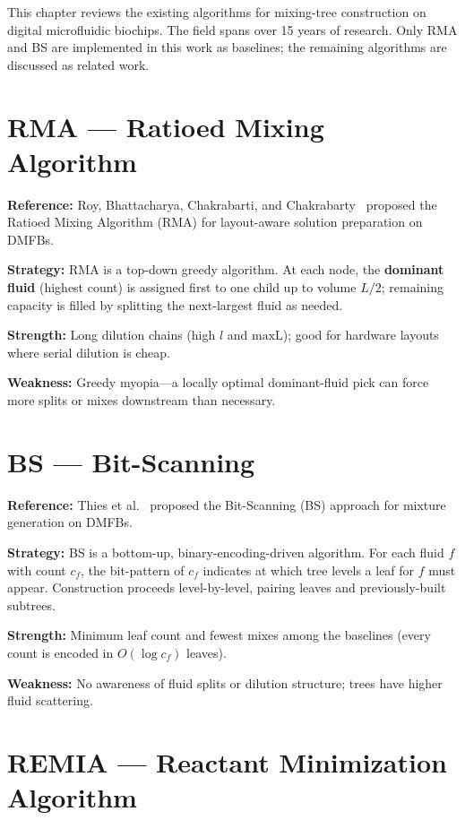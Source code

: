 
This chapter reviews the existing algorithms for mixing-tree construction on digital microfluidic biochips. The field spans over 15 years of research. Only RMA and BS are implemented in this work as baselines; the remaining algorithms are discussed as related work.

\section{RMA --- Ratioed Mixing Algorithm}
\label{sec:rma}

\textbf{Reference:} Roy, Bhattacharya, Chakrabarti, and Chakrabarty~\cite{roy2010layout} proposed the Ratioed Mixing Algorithm (RMA) for layout-aware solution preparation on DMFBs.

\textbf{Strategy:} RMA is a top-down greedy algorithm. At each node, the \textbf{dominant fluid} (highest count) is assigned first to one child up to volume $L/2$; remaining capacity is filled by splitting the next-largest fluid as needed.

\textbf{Strength:} Long dilution chains (high $l$ and $\text{maxL}$); good for hardware layouts where serial dilution is cheap.

\textbf{Weakness:} Greedy myopia---a locally optimal dominant-fluid pick can force more splits or mixes downstream than necessary.

\section{BS --- Bit-Scanning}
\label{sec:bs}

\textbf{Reference:} Thies et al.~\cite{thies_bs} proposed the Bit-Scanning (BS) approach for mixture generation on DMFBs.

\textbf{Strategy:} BS is a bottom-up, binary-encoding-driven algorithm. For each fluid $f$ with count $c_f$, the bit-pattern of $c_f$ indicates at which tree levels a leaf for $f$ must appear. Construction proceeds level-by-level, pairing leaves and previously-built subtrees.

\textbf{Strength:} Minimum leaf count and fewest mixes among the baselines (every count is encoded in $O(\log c_f)$ leaves).

\textbf{Weakness:} No awareness of fluid splits or dilution structure; trees have higher fluid scattering.

\section{REMIA --- Reactant Minimization Algorithm}

